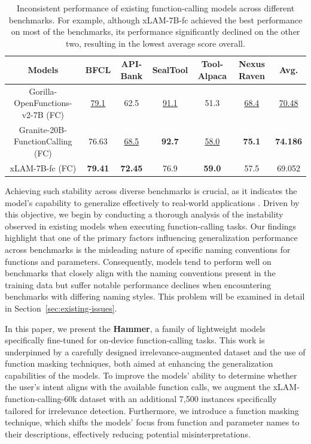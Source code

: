 \documentclass{article}
\begin{document}
\begin{table}[h]
\scriptsize
\centering
\caption{Inconsistent performance of existing function-calling models across different benchmarks. For example, although xLAM-7B-fc achieved the best performance on most of the benchmarks, its performance significantly declined on the other two, resulting in the lowest average score overall.}
\label{table:inconsistency}
\begin{tabular}{c|ccccc|c}
\toprule
Models& BFCL & API-Bank & SealTool & Tool-Alpaca & Nexus Raven & Avg. \\ %
\midrule
Gorilla-OpenFunctions-v2-7B (FC) & \underline{79.1} & 62.5 & \underline{91.1} & 51.3 & \underline{68.4} & \underline{70.48}\\ %
Granite-20B-FunctionCalling (FC) & 76.63 & \underline{68.5} & \textbf{92.7} & \underline{58.0} & \textbf{75.1} & \textbf{74.186}\\ %
xLAM-7B-fc (FC) & \textbf{79.41} & \textbf{72.45} & 76.9 & \textbf{59.0} & 57.5 & 69.052\\ %
\bottomrule
\end{tabular}
\end{table}

Achieving such stability across diverse benchmarks is crucial, as it indicates the model's capability to generalize effectively to real-world applications \citep{yao2022webshop}. Driven by this objective, we begin by conducting a thorough analysis of the instability observed in existing models when executing function-calling tasks. Our findings highlight that one of the primary factors influencing generalization performance across benchmarks is the misleading nature of specific naming conventions for functions and parameters. Consequently, models tend to perform well on benchmarks that closely align with the naming conventions present in the training data but suffer notable performance declines when encountering benchmarks with differing naming styles. This problem will be examined in detail in Section~\ref{sec:existing-issues}.


In this paper, we present the \textbf{Hammer}, a family of lightweight models specifically fine-tuned for on-device function-calling tasks. This work is underpinned by a carefully designed irrelevance-augmented dataset and the use of function masking techniques, both aimed at enhancing the generalization capabilities of the models. To improve the models' ability to determine whether the user's intent aligns with the available function calls, we augment the xLAM-function-calling-60k dataset \citep{liu2024apigenautomatedpipelinegenerating} with an additional 7,500 instances specifically tailored for irrelevance detection. Furthermore, we introduce a function masking technique, which shifts the models' focus from function and parameter names to their descriptions, effectively reducing potential misinterpretations.
\end{document}
